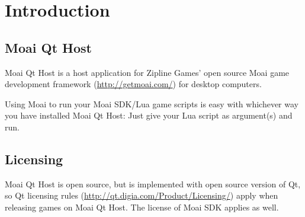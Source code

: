 \chapter{Introduction}
\label{chap:quick}

\section{Moai Qt Host}

Moai Qt Host is a host application for Zipline Games' open source Moai game development framework (\url{http://getmoai.com/}) for desktop computers. 

Using Moai to run your Moai SDK/Lua game scripts is easy with whichever way you have installed Moai Qt Host: Just give your Lua script as argument(s) and run.

\section{Licensing}

Moai Qt Host is open source, but is implemented with open source version of Qt, so Qt licensing rules (\url{http://qt.digia.com/Product/Licensing/}) apply when releasing games on Moai Qt Host. The license of Moai SDK applies as well.
